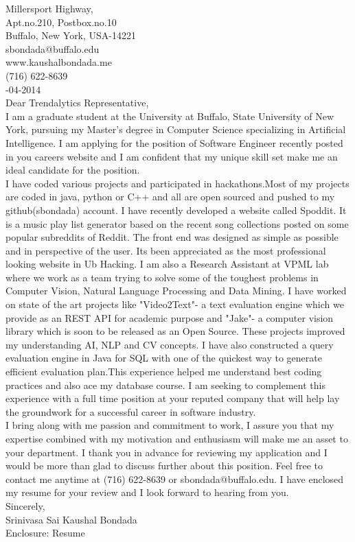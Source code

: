 \documentclass[10pt,letterpaper,oneside]{article}
\begin{document}
 Millersport Highway,\\
Apt.no.210, Postbox.no.10\\
Buffalo, New York, USA-14221\\
sbondada@buffalo.edu\\
www.kaushalbondada.me\\
(716) 622-8639\\

-04-2014\\
 
\noindent Dear Trendalytics Representative,\\
 
I am a graduate student at the University at Buffalo, State University of New York, pursuing my
Master's degree in Computer Science specializing in Artificial Intelligence. I am applying for the position of 
Software Engineer recently posted in you careers website and I am confident that my unique skill set make me an ideal
 candidate for the position.\\

I have coded various projects and participated in hackathons.Most of my projects are coded in java,
python or C++ and 
all are open sourced and pushed to my github(sbondada) account. I have recently developed a website called 
Spoddit. It is a music play list generator based on the recent song collections posted on some popular subreddits 
of Reddit. The front end was designed as simple as possible and in perspective of the user. Its been
appreciated as the most professional looking website in Ub Hacking. I am also a Research Assistant at
VPML lab where we work as a team trying to solve some of the toughest problems in Computer Vision,
Natural Language Processing and Data Mining. I have worked on state of the art projects like 
"Video2Text"- a text evaluation
engine which we provide as an REST API for academic purpose and "Jake"- a computer vision library which is soon 
to be released as an Open Source. These projects improved my understanding AI, NLP and CV concepts. I have also constructed a query evaluation engine in Java for SQL with one of the quickest
way to generate efficient evaluation plan.This experience helped me understand best coding practices
and also ace my database course. I am seeking to complement this experience with a full time position at your reputed company that will help lay the groundwork for a successful career in software industry.\\

I bring along with me passion and commitment to work, I assure you that my expertise combined with my motivation
and enthusiasm will make me an asset to your department. I thank you in advance for reviewing my application and 
I would be more than glad to discuss further about this position. Feel free to contact me anytime at 
(716) 622-8639 or sbondada@buffalo.edu. I have enclosed my resume for your review and I look forward to hearing 
from you.\\
 
\noindent Sincerely,\\
Srinivasa Sai Kaushal Bondada\\
Enclosure: Resume\\
\end{document}
